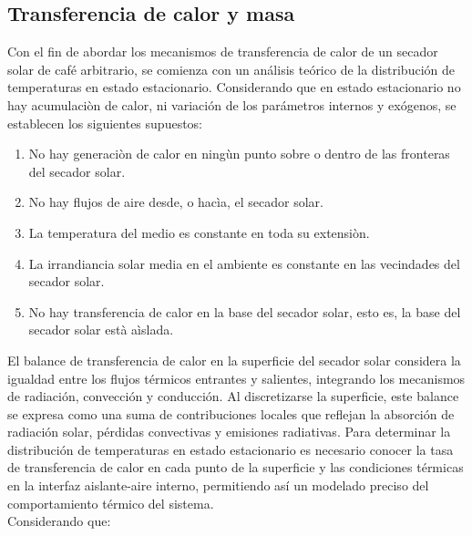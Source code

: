 \documentclass[12pt]{article}
\begin{document}
\subsection{Transferencia de calor y masa}

Con el fin de abordar los mecanismos de transferencia de calor de un secador solar de café arbitrario, se comienza con un análisis teórico de la distribución de temperaturas en estado estacionario. Considerando que en estado estacionario no hay acumulaciòn de calor, ni variación de los parámetros internos y exógenos, se establecen los siguientes supuestos:

\begin{enumerate}
    \item No hay generaciòn de calor en ningùn punto sobre o dentro de las fronteras del secador solar. 
    \item No hay flujos de aire desde, o hacìa, el secador solar. 
    \item La temperatura del medio es constante en toda su extensiòn.
    \item La irrandiancia solar media en el ambiente es constante en las vecindades del secador solar. 
    \item No hay transferencia de calor en la base del secador solar, esto es, la base del secador solar està aìslada. 
\end{enumerate}

El balance de transferencia de calor en la superficie del secador solar considera la igualdad entre los flujos térmicos entrantes y salientes, integrando los mecanismos de radiación, convección y conducción. Al discretizarse la superficie, este balance se expresa como una suma de contribuciones locales que reflejan la absorción de radiación solar, pérdidas convectivas y emisiones radiativas. Para determinar la distribución de temperaturas en estado estacionario es necesario conocer la tasa de transferencia de calor en cada punto de la superficie y las condiciones térmicas en la interfaz aislante-aire interno, permitiendo así un modelado preciso del comportamiento térmico del sistema.\\

Considerando que:
\end{document}
